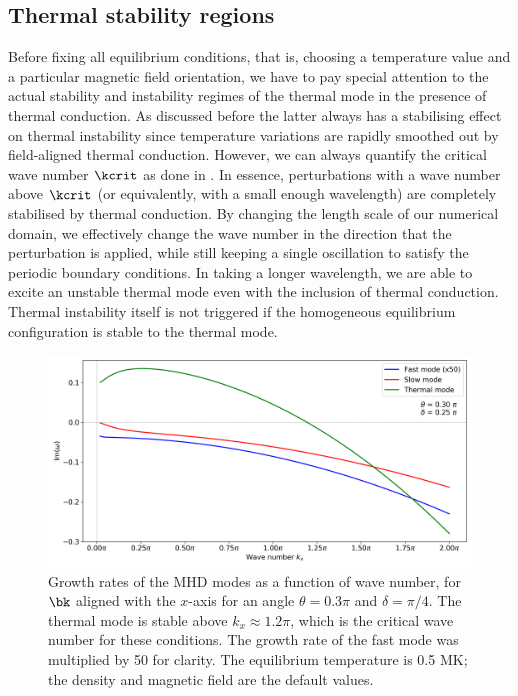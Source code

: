 \subsection{Thermal stability regions}
Before fixing all equilibrium conditions, that is, choosing a temperature value and a particular magnetic field orientation, we have to pay special attention to the actual stability and instability regimes of the thermal mode in the presence of thermal conduction. As discussed before the latter always has a stabilising effect on thermal instability since temperature variations are rapidly smoothed out by field-aligned thermal conduction. However, we can always quantify the critical wave number $\kcrit$ as done in \citet{field1965}. In essence, perturbations with a wave number above $\kcrit$ (or equivalently, with a small enough wavelength) are completely stabilised by thermal conduction. By changing the length scale of our numerical domain, we effectively change the wave number in the direction that the perturbation is applied, while still keeping a single oscillation to satisfy the periodic boundary conditions. In taking a longer wavelength, we are able to excite an unstable thermal mode even with the inclusion of thermal conduction. Thermal instability itself is not triggered if the homogeneous equilibrium configuration is stable to the thermal mode.

\begin{figure}[t]
  \centering
  \includegraphics[width=\textwidth]{w_vs_kx.png}
  \caption{
    Growth rates of the MHD modes as a function of wave number, for $\bk$ aligned with the $x$-axis for an angle $\theta = 0.3\pi$ and $\delta = \pi/4$. The thermal mode is stable above $k_x \approx 1.2\pi$, which is the critical wave number for these conditions. The growth rate of the fast mode was multiplied by 50 for clarity. The equilibrium temperature is 0.5 MK; the density and magnetic field are the default values.
  }
  \label{fig: w_vs_kx}
\end{figure}

